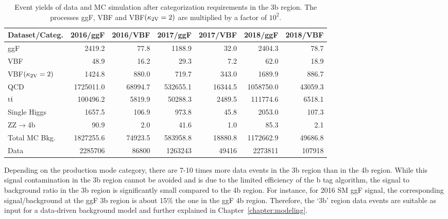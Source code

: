 \begin{table}[htb]
\caption[Event yields of data and MC simulation after categorization requirements in the 3b region]{\label{event_selection:tab:3bdatamc}Event yields of data and MC simulation after categorization requirements in the 3b region. The processes ggF, VBF and VBF$(\mathrm{\kappa_{2V} }=2)$ are multiplied by a factor of $10^{2}$.}
\centering
\begin{tabularx}{\textwidth}{l r r r r r r}
	\hline
	Dataset/Categ.          & 2016/ggF  & 2016/VBF  & 2017/ggF  & 2017/VBF  & 2018/ggF   & 2018/VBF \\
	\hline
	ggF            &    2419.2 &      77.8 &    1188.9 &      32.0 &     2404.3 &      78.7 \\ 
	VBF            &      48.9 &      16.2 &      29.3 &       7.2 &       62.0 &      18.9 \\ 
	VBF$(\mathrm{\kappa_{2V} }=2)$  &    1424.8 &     880.0 &     719.7 &     343.0 &     1689.9 &     886.7 \\
	QCD                     & 1725011.0 &   68994.7 &  532655.1 &   16344.5 &  1058750.0 &   43059.3 \\ 
	$\mathrm{t\overline{t}}$&  100496.2 &    5819.9 &   50288.3 &    2489.5 &   111774.6 &    6518.1 \\ 
	Single Higgs            &    1657.5 &     106.9 &     973.8 &      45.8 &     2053.0 &     107.3 \\ 
	ZZ$\rightarrow$4b       &      90.9 &       2.0 &      41.6 &       1.0 &       85.3 &       2.1 \\
	Total MC Bkg.           & 1827255.6 &   74923.5 &  583958.8 &   18880.8 &  1172662.9 &   49686.8 \\
	Data                    &   2285706 &   86800 & 1263243&   49416 &  2273811 &  107918 \\
	\hline
\end{tabularx}
\end{table}

Depending on the production mode category, there are 7-10 times more data events in the 3b region than in the 4b region. While this signal contamination in the 3b region cannot be avoided and is due to the limited efficiency of the b tag algorithm, the signal to background ratio in the 3b region is significantly small compared to the 4b region. For instance, for 2016 SM ggF signal, the corresponding signal/background at the ggF 3b region is about 15\% the one in the ggF 4b region. Therefore, the `3b' region data events are suitable as input for a data-driven background model and further explained in Chapter~\ref{chapter:modeling}.

